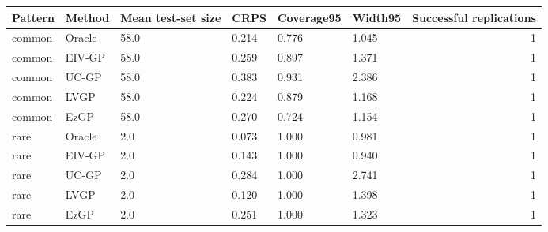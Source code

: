 
\begin{tabular}{llllllr}
\toprule
Pattern & Method & Mean test-set size & CRPS & Coverage95 & Width95 & Successful replications\\
\midrule
common & Oracle & 58.0 & 0.214 & 0.776 & 1.045 & 1\\
common & EIV-GP & 58.0 & 0.259 & 0.897 & 1.371 & 1\\
common & UC-GP & 58.0 & 0.383 & 0.931 & 2.386 & 1\\
common & LVGP & 58.0 & 0.224 & 0.879 & 1.168 & 1\\
common & EzGP & 58.0 & 0.270 & 0.724 & 1.154 & 1\\
\addlinespace
rare & Oracle & 2.0 & 0.073 & 1.000 & 0.981 & 1\\
rare & EIV-GP & 2.0 & 0.143 & 1.000 & 0.940 & 1\\
rare & UC-GP & 2.0 & 0.284 & 1.000 & 2.741 & 1\\
rare & LVGP & 2.0 & 0.120 & 1.000 & 1.398 & 1\\
rare & EzGP & 2.0 & 0.251 & 1.000 & 1.323 & 1\\
\bottomrule
\end{tabular}

